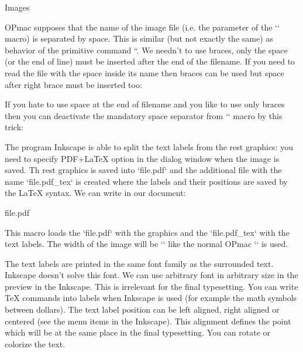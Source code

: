  \sec Images 

 


OPmac supposes that the name of the image file (i.e. the parameter of the `\inspic` macro) is separated by space. This is similar (but not exactly the same) as behavior of the primitive command ``. We needn't to use braces, only the space (or the end of line) must be inserted after the end of the filename. If you need to read the file with the space inside its name then braces can be used but space after right brace must be inserted too: 

\begtt
{} %
\endtt


If you hate to use space at the end of filename and you like to use only braces then you can deactivate the mandatory space separator from `\inspic` macro by this trick: 

\begtt
\expandafter\def\expandafter\inspic\expandafter#\expandafter1\expandafter{\inspic{#1} } 
\endtt

 


The program Inkscape is able to split the text labels from the rest graphics: you need to specify PDF+LaTeX option in the dialog window when the image is saved. Th rest graphics is saved into `file.pdf` and the additional file with the name `file.pdf_tex` is created where the labels and their positions are saved by the LaTeX syntax. We can write in our document: 

\begtt
\inkinspic file.pdf 
\endtt


This macro loads the `file.pdf` with the graphics and the `file.pdf_tex` with the text labels. The width of the image will be `\picw` like the normal OPmac `\inspic` is used. 



The text labels are printed in the same font family as the surrounded text. Inkscape doesn't solve this font. We can use arbitrary font in arbitrary size in the preview in the Inkscape. This is irrelevant for the final typesetting. You can write TeX commands into labels when Inkscape is used (for example the math symbols between dollars). The text label position can be left aligned, right aligned or centered (see the menu items in the Inkscape). This alignment defines the point which will be at the same place in the final typesetting. You can rotate or colorize the text. 



